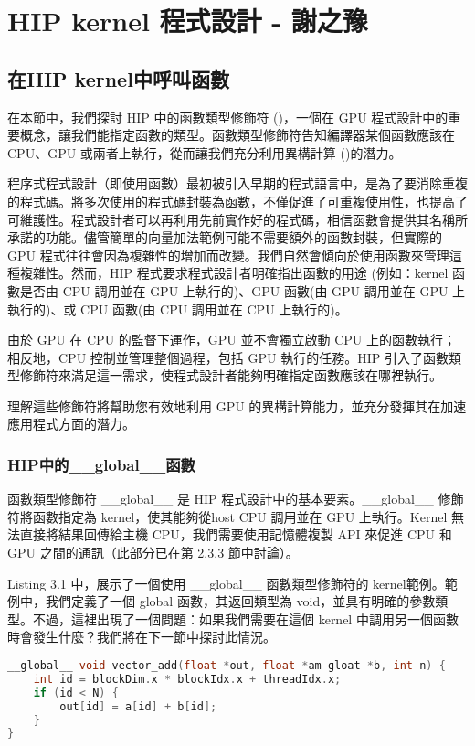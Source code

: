 \chapter{HIP kernel 程式設計 - 謝之豫}
\section{在HIP kernel中呼叫函數}
在本節中，我們探討 HIP 中的函數類型修飾符 ()，一個在 GPU 程式設計中的重要概念，讓我們能指定函數的類型。函數類型修飾符告知編譯器某個函數應該在 CPU、GPU 或兩者上執行，從而讓我們充分利用異構計算 ()的潛力。

程序式程式設計（即使用函數）最初被引入早期的程式語言中，是為了要消除重複的程式碼。將多次使用的程式碼封裝為函數，不僅促進了可重複使用性，也提高了可維護性。程式設計者可以再利用先前實作好的程式碼，相信函數會提供其名稱所承諾的功能。儘管簡單的向量加法範例可能不需要額外的函數封裝，但實際的 GPU 程式往往會因為複雜性的增加而改變。我們自然會傾向於使用函數來管理這種複雜性。然而，HIP 程式要求程式設計者明確指出函數的用途 (例如：kernel 函數是否由 CPU 調用並在 GPU 上執行的)、GPU 函數(由 GPU 調用並在 GPU 上執行的)、或 CPU 函數(由 CPU 調用並在 CPU 上執行的)。

由於 GPU 在 CPU 的監督下運作，GPU 並不會獨立啟動 CPU 上的函數執行；相反地，CPU 控制並管理整個過程，包括 GPU 執行的任務。HIP 引入了函數類型修飾符來滿足這一需求，使程式設計者能夠明確指定函數應該在哪裡執行。

理解這些修飾符將幫助您有效地利用 GPU 的異構計算能力，並充分發揮其在加速應用程式方面的潛力。

\subsection{HIP中的\_\_global\_\_函數}

函數類型修飾符 \_\_global\_\_ 是 HIP 程式設計中的基本要素。\_\_global\_\_ 修飾符將函數指定為 kernel，使其能夠從host CPU 調用並在 GPU 上執行。Kernel 無法直接將結果回傳給主機 CPU，我們需要使用記憶體複製 API 來促進 CPU 和 GPU 之間的通訊（此部分已在第 2.3.3 節中討論）。

Listing 3.1 中，展示了一個使用 \_\_global\_\_ 函數類型修飾符的 kernel範例。範例中，我們定義了一個 global 函數，其返回類型為 void，並具有明確的參數類型。不過，這裡出現了一個問題：如果我們需要在這個 kernel 中調用另一個函數時會發生什麼？我們將在下一節中探討此情況。

\begin{lstlisting}[language=C, caption={在HIP kernel中使用\_\_global\_\_函數}, label={lst:example}]
__global__ void vector_add(float *out, float *am gloat *b, int n) {
    int id = blockDim.x * blockIdx.x + threadIdx.x;
    if (id < N) {
        out[id] = a[id] + b[id];
    }
}
\end{lstlisting}

